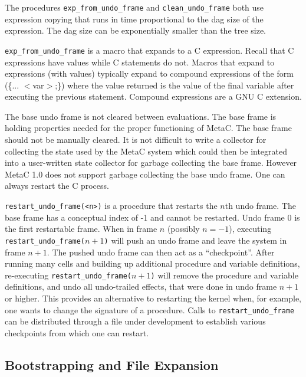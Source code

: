 \documentclass{article}
\begin{document}
The procedures {\tt exp\_from\_undo\_frame} and {\tt clean\_undo\_frame} both use expression copying that runs
in time proportional to the dag size of the expression. The dag size can be exponentially smaller than the tree size.

{\tt exp\_from\_undo\_frame} is a macro that expands to a C expression.  Recall that C expressions have values
while C statements do not.  Macros that expand to expressions (with values)
typically expand to compound expressions of the form (\{... $<$var$>$;\}) where the value returned
is the value of the final variable after executing the previous statement.  Compound expressions are a GNU C extension.

The base undo frame is not cleared between evaluations. The base frame is holding properties needed for
the proper functioning of MetaC.
The base frame should not be manually cleared.  It is not difficult to write a collector for collecting the state used by the MetaC system which could then be integrated
into a user-written state collector for garbage collecting the base frame.  However MetaC 1.0 does not support garbage collecting the base undo frame.  One can always
restart the C process.

{\tt restart\_undo\_frame(<n>)} is a procedure that restarts the $n$th undo frame.  The base frame has a conceptual index of -1 and cannot be restarted.
Undo frame 0 is the first restartable frame. When in frame $n$ (possibly $n = -1$), executing {\tt restart\_undo\_frame($n+1$)}
will push an undo frame and leave the system in frame $n+1$.  The pushed undo frame can then act as a ``checkpoint''.
After running many cells and building up additional procedure and variable definitions, re-executing {\tt restart\_undo\_frame($n+1$)}
will remove the procedure and variable definitions, and undo all undo-trailed effects, that were done in undo frame $n+1$ or higher.
This provides an alternative to restarting the kernel when, for example, one wants to change the signature of a procedure.
Calls to {\tt restart\_undo\_frame} can be distributed through a file under development to establish various checkpoints from which one can restart.


\subsection{Bootstrapping and File Expansion}
\label{sec:bootstrap}
\end{document}
